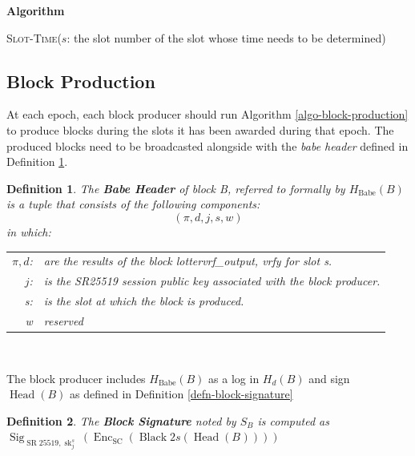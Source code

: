 \documentclass{book}
\newcommand{\tmem}[1]{{\em #1\/}}
\newcommand{\tmname}[1]{\textsc{#1}}
\newcommand{\tmop}[1]{\ensuremath{\operatorname{#1}}}
\newcommand{\tmstrong}[1]{\textbf{#1}}
\newcommand{\tmtextbf}[1]{{\bfseries{#1}}}
\newcommand{\tmtextup}[1]{{\upshape{#1}}}
\newenvironment{tmindent}{\begin{tmparmod}{1.5em}{0pt}{0pt}}{\end{tmparmod}}
\newenvironment{tmparmod}[3]{\begin{list}{}{\setlength{\topsep}{0pt}\setlength{\leftmargin}{#1}\setlength{\rightmargin}{#2}\setlength{\parindent}{#3}\setlength{\listparindent}{\parindent}\setlength{\itemindent}{\parindent}\setlength{\parsep}{\parskip}} \item[]}{\end{list}}
\newcounter{tmcounter}
\newcommand{\custombinding}[1]{%
  \setcounter{tmcounter}{#1}%
  \addtocounter{tmcounter}{-1}%
  \refstepcounter{tmcounter}}
\newtheorem{definition}{Definition}
\newtheorem{definition}{Definition}
\begin{document}
\custombinding{8}{\noindent}\begin{tmparmod}{0pt}{0pt}{0em}%
    \tmtextbf{Algorithm \tmtextup{8}}{\smallskip}
    
    \begin{tmindent}
      \label{algo-slot-time}{\tmname{Slot-Time}}($s$: the slot number of the
      slot whose time needs to be determined)
    \end{tmindent}
\end{tmparmod}{\medskip}

\subsection{Block Production}

At each epoch, each block producer should run Algorithm
\ref{algo-block-production} to produce blocks during the slots it has been
awarded during that epoch. The produced blocks need to be broadcasted
alongside with the {\tmem{babe header}} defined in Definition
\ref{defn-babe-header}.

\begin{definition}
  The \label{defn-babe-header}{\tmstrong{Babe Header}} of block B, referred to
  formally by {\tmstrong{$H_{\tmop{Babe}} (B)$}} is a tuple that consists of
  the following components:
  \[ (\pi, d, j, s, w) \]
  in which:
  
  \begin{center}
    \begin{tabular}{rl}
      $\pi, d$: & are the results of the block lottervrf\_output, vrfy for
      slot s. \\
      $j$: & is the SR25519 session public key associated with the block
      producer. \\
      s: & is the slot at which the block is produced.\\
      w & reserved
    \end{tabular}
  \end{center}
  
  \ 
\end{definition}

The block producer includes $H_{\tmop{Babe}} (B)$ as a log in $H_d (B)$ and
sign $\tmop{Head} (B)$ as defined in Definition \ref{defn-block-signature}

\begin{definition}
  \label{block-signature}The {\tmstrong{Block Signature}} noted by $S_B$ is
  computed as $\tmop{Sig}_{\tmop{SR} 25519, \tmop{sk}^s_j}
  (\tmop{Enc}_{\tmop{SC}} (\tmop{Black} 2 s (\tmop{Head} (B_{}))))$
\end{definition}
\end{document}
